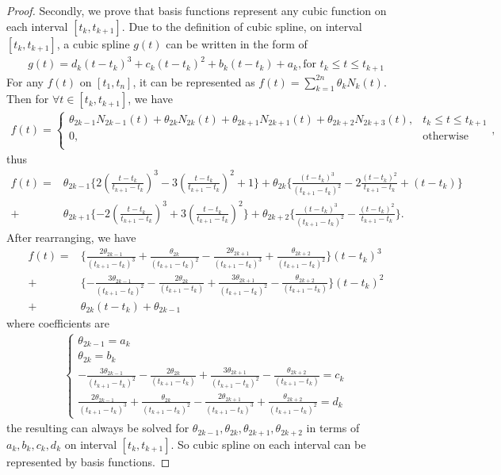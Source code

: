 \begin{proof}
Secondly, we prove that basis functions represent any cubic function on each interval $[t_k, t_{k+1}]$. Due to the definition of cubic spline, on interval $[t_k, t_{k+1}]$, a cubic spline $g(t)$ can be written in the form of
\begin{eqnarray}
g(t)=d_k (t-t_k)^3+c_k(t-t_k)^2+b_k(t-t_k)+a_k, \mbox{for $t_k \leq t \leq t_{k+1}$}
\end{eqnarray}
For any $f(t)$ on $[t_1, t_n]$, it can be represented as $f(t)=\sum_{k=1}^{2n} \theta_k N_k(t)$. Then for $\forall t \in [t_k,t_{k+1}]$, we have
\begin{align*}
f(t)=\begin{cases}
\theta_{2k-1}N_{2k-1}(t)+\theta_{2k}N_{2k}(t)+\theta_{2k+1}N_{2k+1}(t)+\theta_{2k+2}N_{2k+3}(t), & t_k \leq t \leq t_{k+1}  \\
0, & \mbox{otherwise}\\
\end{cases},
\end{align*}
thus
\begin{align*}
f(t)=&\theta_{2k-1}\{ 2(\frac{t-t_{k}}{t_{k+1}-t_{k}})^3-3(\frac{t-t_{k}}{t_{k+1}-t_{k}})^2+1  \} +\theta_{2k} \{  \frac{(t-t_{k})^3}{(t_{k+1}-t_{k})^2}-2\frac{(t-t_{k})^2}{t_{k+1}-t_{k}}+(t-t_{k}) \} \\
+&\theta_{2k+1} \{ -2(\frac{t-t_k}{t_{k+1}-t_k})^3+3(\frac{t-t_k}{t_{k+1}-t_k})^2  \}  +\theta_{2k+2} \{  \frac{(t-t_k)^3}{(t_{k+1}-t_k)^2}-\frac{(t-t_k)^2}{t_{k+1}-t_k} \}.
\end{align*}
After rearranging, we have
\begin{align*}
f(t)=& \{ \frac{2\theta_{2k-1}}{(t_{k+1}-t_{k})^3} +\frac{\theta_{2k}}{(t_{k+1}-t_{k})^2} -\frac{2\theta_{2k+1}}{(t_{k+1}-t_{k})^3} +\frac{\theta_{2k+2}}{(t_{k+1}-t_{k})^2} \} (t-t_k)^3 \\
+&  \{ -\frac{3\theta_{2k-1}}{(t_{k+1}-t_{k})^2} -\frac{2\theta_{2k}}{(t_{k+1}-t_{k})} +\frac{3\theta_{2k+1}}{(t_{k+1}-t_{k})^2} - \frac{\theta_{2k+2}}{(t_{k+1}-t_{k})} \} (t-t_k)^2 \\
+&  \theta_{2k} (t-t_k) +\theta_{2k-1}
\end{align*}
where coefficients are
\begin{align*}
\begin{cases}
\theta_{2k-1}=a_k\\
\theta_{2k}=b_k\\
-\frac{3\theta_{2k-1}}{(t_{k+1}-t_{k})^2} -\frac{2\theta_{2k}}{(t_{k+1}-t_{k})} +\frac{3\theta_{2k+1}}{(t_{k+1}-t_{k})^2} - \frac{\theta_{2k+2}}{(t_{k+1}-t_{k})}=c_k\\
\frac{2\theta_{2k-1}}{(t_{k+1}-t_{k})^3} +\frac{\theta_{2k}}{(t_{k+1}-t_{k})^2} -\frac{2\theta_{2k+1}}{(t_{k+1}-t_{k})^3} +\frac{\theta_{2k+2}}{(t_{k+1}-t_{k})^2}=d_k
\end{cases}
\end{align*}
the resulting can always be solved for $\theta_{2k-1}, \theta_{2k},\theta_{2k+1},\theta_{2k+2}$ in terms of $a_k,b_k,c_k,d_k$ on interval $[t_k, t_{k+1}]$. So cubic spline on each interval can be represented by basis functions. 


\end{proof}
